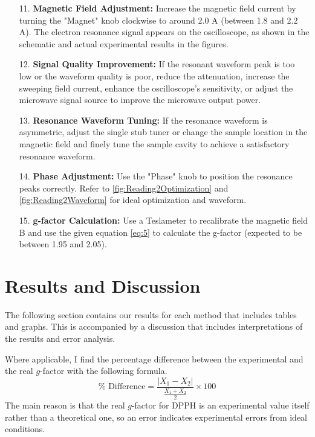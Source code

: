 \documentclass[11pt]{article}
\begin{document}
\begin{enumerate}
		\item[11.] \textbf{Magnetic Field Adjustment:} Increase the magnetic field current by turning the "Magnet" knob clockwise to around 2.0 A (between 1.8 and 2.2 A). The electron resonance signal appears on the oscilloscope, as shown in the schematic and actual experimental results in the figures.
		\item[12.] \textbf{Signal Quality Improvement:} If the resonant waveform peak is too low or the waveform quality is poor, reduce the attenuation, increase the sweeping field current, enhance the oscilloscope's sensitivity, or adjust the microwave signal source to improve the microwave output power.
		\item[13.] \textbf{Resonance Waveform Tuning:} If the resonance waveform is asymmetric, adjust the single stub tuner or change the sample location in the magnetic field and finely tune the sample cavity to achieve a satisfactory resonance waveform.
		\item[14.] \textbf{Phase Adjustment:} Use the "Phase" knob to position the resonance peaks correctly. Refer to \ref{fig:Reading2Optimization} and \ref{fig:Reading2Waveform} for ideal optimization and waveform.
		\item[15.] \textbf{g-factor Calculation:} Use a Teslameter to recalibrate the magnetic field B and use the given equation \ref{eq:5} to calculate the g-factor (expected to be between 1.95 and 2.05).
		
		
		
		
		
	\end{enumerate}
	
	\clearpage
	
	\section{Results and Discussion}
	
	The following section contains our results for each method that includes tables and graphs. This is accompanied by a discussion that includes interpretations of the results and error analysis.
	
	Where applicable, I find the percentage difference between the experimental and the real $g$-factor with the following formula.
	\[
	\% \text{ Difference} = \frac{\left| X_1 - X_2 \right|}{\frac{X_1 + X_2}{2}} \times 100
	\]
	The main reason is that the real $g$-factor for DPPH is an experimental value itself rather than a theoretical one, so an error indicates experimental errors from ideal conditions.
	
\end{document}
